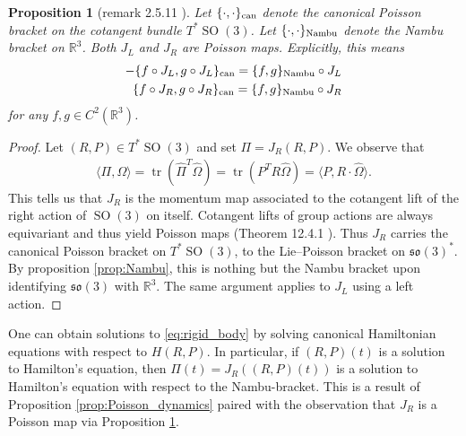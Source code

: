 \documentclass[12pt]{amsart}
\newcommand{\so}{\ensuremath{\mathfrak{so}}}
\newtheorem{prop}[thm]{Proposition}
\DeclareMathOperator{\SO}{SO}
\DeclareMathOperator{\tr}{tr}
\begin{document}
  \begin{prop}[remark 2.5.11 \cite{HolmBook2}] \label{prop:SO3_to_Nambu}
    Let $\{ \cdot , \cdot \}_{\rm can}$ denote the canonical Poisson bracket
    on the cotangent bundle $T^* \SO(3)$.
    Let $\{ \cdot , \cdot \}_{\rm Nambu}$ denote the Nambu bracket on $\mathbb{R}^3$.
    Both $J_L$ and $J_R$ are Poisson maps.
    Explicitly, this means
    \begin{align*}
      -\{ f \circ J_L , g \circ J_L \}_{\rm can} = \{ f , g \}_{\rm Nambu} \circ J_L \\
      \{ f \circ J_R , g \circ J_R \}_{\rm can} = \{ f , g \}_{\rm Nambu} \circ J_R \\
    \end{align*}
    for any $f,g \in C^2( \mathbb{R}^3)$.
  \end{prop}
  \begin{proof}
    Let $(R,P) \in T^* \SO(3)$ and set $\Pi = J_R(R,P)$.
    We observe that
    \begin{align*}
      \langle \Pi , \Omega \rangle
      = \tr( \hat{\Pi}^T \hat{\Omega} ) 
      = \tr( P^T R \hat{\Omega} ) 
      = \langle P , R \cdot \hat{\Omega} \rangle.
    \end{align*}
    This tells us that $J_R$ is the momentum map associated
    to the cotangent lift of the right action of $\SO(3)$ on itself.
    Cotangent lifts of group actions are always equivariant
    and thus yield Poisson maps (Theorem 12.4.1 \cite{MandS}).
    Thus $J_R$ carries the canonical
    Poisson bracket on $T^* \SO(3)$, to the Lie--Poisson
    bracket on $\so(3)^*$.
    By proposition \ref{prop:Nambu}, this is nothing but the
    Nambu bracket upon identifying $\so(3)$ with $\mathbb{R}^3$.
    The same argument applies to $J_L$ using a left action.
  \end{proof}

  One can obtain solutions to \eqref{eq:rigid_body}
  by solving canonical Hamiltonian equations with respect to $H(R,P)$.
  In particular, if $(R,P)(t)$ is a solution to Hamilton's equation,
  then $\Pi(t) = J_R( (R,P)(t))$ is a solution to Hamilton's equation
  with respect to the Nambu-bracket.
  This is a result of Proposition \ref{prop:Poisson_dynamics}
  paired with the observation that $J_R$ is a Poisson map via
  Proposition \ref{prop:SO3_to_Nambu}.
\end{document}
